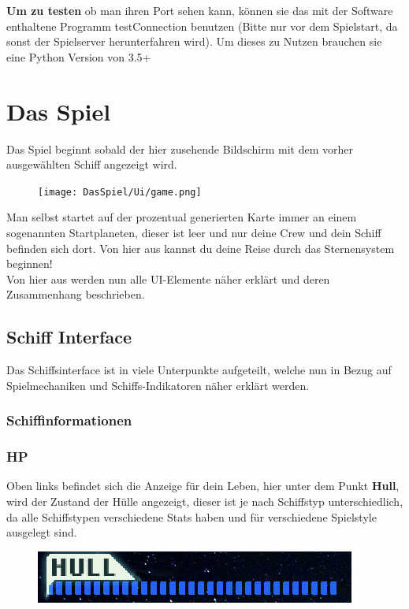 \documentclass[fontsize=12pt,paper=a4,twoside]{scrartcl}
\begin{document}
\textbf{Um zu testen} ob man ihren Port sehen kann, können sie das mit der Software enthaltene Programm testConnection benutzen (Bitte nur vor dem Spielstart, da sonst der Spielserver herunterfahren wird). Um dieses zu Nutzen brauchen sie eine Python Version von 3.5+ 

\newpage
\section{Das Spiel}
Das Spiel beginnt sobald der hier zusehende Bildschirm mit dem vorher ausgewählten Schiff angezeigt wird. 
\begin{figure}[H]
\centering
\texttt{[image: DasSpiel/Ui/game.png]}
\end{figure} 

Man selbst startet auf der prozentual generierten Karte immer an einem sogenannten Startplaneten, dieser ist leer und nur deine Crew und dein Schiff befinden sich dort. Von hier aus kannst du deine Reise durch das Sternensystem beginnen!  
\\
Von hier aus werden nun alle UI-Elemente näher erklärt und deren Zusammenhang beschrieben.


\subsection{Schiff Interface}

Das Schiffsinterface ist in viele Unterpunkte aufgeteilt, welche nun in Bezug auf Spielmechaniken und Schiffs-Indikatoren näher erklärt werden.
\\


\subsubsection{Schiffinformationen}
\subsubsection{HP}
Oben links befindet sich die Anzeige für dein Leben, hier unter dem Punkt \textbf{Hull}, wird der Zustand der Hülle angezeigt, dieser ist je nach Schiffstyp unterschiedlich, da alle Schiffstypen verschiedene Stats haben und für verschiedene Spielstyle ausgelegt sind. 

\begin{figure}[H]
\centering
\includegraphics[width=0.8\linewidth]{DasSpiel/Ui/HP.png}
\end{figure} 
\end{document}
